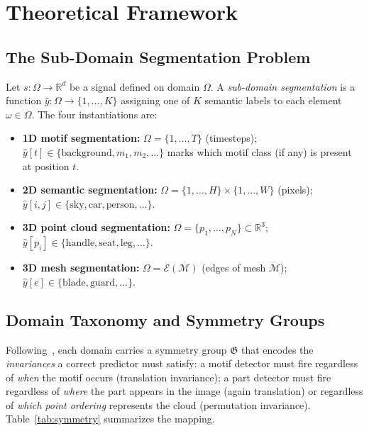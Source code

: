 \documentclass[10pt,conference]{IEEEtran}
\newcommand{\R}{\mathbb{R}}
\newcommand{\fG}{\mathfrak{G}}
\begin{document}
\section{Theoretical Framework}
\label{sec:theory}

\subsection{The Sub-Domain Segmentation Problem}

Let $s\colon\Omega\to\R^d$ be a signal defined on domain $\Omega$.  A
\emph{sub-domain segmentation} is a function $\hat{y}\colon\Omega\to\{1,\ldots,K\}$
assigning one of $K$ semantic labels to each element $\omega\in\Omega$.
The four instantiations are:

\begin{itemize}
  \item \textbf{1D motif segmentation:} $\Omega=\{1,\ldots,T\}$ (timesteps);
    $\hat{y}[t]\in\{\text{background},m_1,m_2,\ldots\}$ marks which motif
    class (if any) is present at position $t$.
  \item \textbf{2D semantic segmentation:} $\Omega=\{1,\ldots,H\}\times\{1,\ldots,W\}$
    (pixels); $\hat{y}[i,j]\in\{\text{sky},\text{car},\text{person},\ldots\}$.
  \item \textbf{3D point cloud segmentation:} $\Omega=\{p_1,\ldots,p_N\}\subset\R^3$;
    $\hat{y}[p_i]\in\{\text{handle},\text{seat},\text{leg},\ldots\}$.
  \item \textbf{3D mesh segmentation:} $\Omega=\mathcal{E}(\mathcal{M})$
    (edges of mesh $\mathcal{M}$); $\hat{y}[e]\in\{\text{blade},\text{guard},\ldots\}$.
\end{itemize}

\subsection{Domain Taxonomy and Symmetry Groups}

Following~\cite{bronstein2021geometric}, each domain carries a symmetry
group $\fG$ that encodes the \emph{invariances} a correct predictor must
satisfy: a motif detector must fire regardless of \emph{when} the motif
occurs (translation invariance); a part detector must fire regardless of
\emph{where} the part appears in the image (again translation) or
regardless of \emph{which point ordering} represents the cloud
(permutation invariance).  Table~\ref{tab:symmetry} summarizes the mapping.
\end{document}
